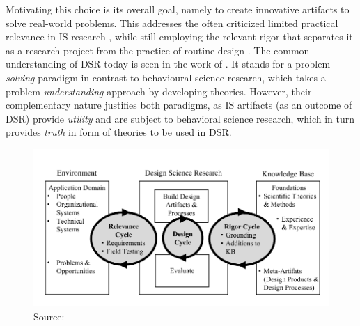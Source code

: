 Motivating this choice is its overall goal, namely to create innovative artifacts to solve real-world problems. This addresses the often criticized limited practical relevance in \acrshort{IS} research \citep{hirschheim}, while still employing the relevant rigor that separates it as a research project from the practice of routine design \citep{Winter2008Hevner}. The common understanding of \acrshort{DSR} today is seen in the work of \cite{Hevner2004}. It stands for a problem-\textit{solving} paradigm in contrast to behavioural science research, which takes a problem \textit{understanding} approach by developing theories. However, their complementary nature justifies both paradigms, as IS artifacts (as an outcome of \acrshort{DSR}) provide \textit{utility} and are subject to behavioral science research, which in turn provides \textit{truth} in form of theories to be used in \acrshort{DSR}.

			
\begin{figure}[caption={Design science research cycles}, label={fig:dsr}]
	{	\includegraphics[width=.8\textwidth]{figures/dsr.pdf}
	Source: \citep{Hevner2010}}
\end{figure}


